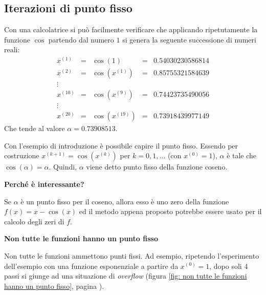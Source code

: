\subsection{Iterazioni di punto fisso}

\begin{examplebox}
    Con una calcolatrice si può facilmente verificare che applicando ripetutamente la funzione $\cos$ partendo dal numero $1$ si genera la seguente successione di numeri reali:
    \begin{equation*}
        \begin{array}{lclcl}
            x^{\left(1\right)}  &=& \cos\left(1\right)                  &=& 0.54030230586814 \\ [1em]
            x^{\left(2\right)}  &=& \cos\left(x^{\left(1\right)}\right) &=& 0.85755321584639 \\
            \vdots              & &                                     & & \\
            x^{\left(10\right)} &=& \cos\left(x^{\left(9\right)}\right) &=& 0.74423735490056 \\
            \vdots              & &                                     & & \\
            x^{\left(20\right)} &=& \cos\left(x^{\left(19\right)}\right)&=& 0.73918439977149
        \end{array}
    \end{equation*}
    Che tende al valore $\alpha = 0.73908513$.
\end{examplebox}

\noindent
Con l'esempio di introduzione è possibile capire il punto fisso. Essendo per costruzione $x^{\left(k+1\right)} = \cos\left(x^{\left(k\right)}\right)$ per $k = 0, 1, \dots$ (con $x^{\left(0\right)} = 1$), $\alpha$ è tale che $\cos\left(\alpha\right) = \alpha$. Quindi, $\alpha$ viene detto punto fisso della funzione coseno.

\highspace
\begin{flushleft}
    \textcolor{Green3}{ \textbf{Perché è interessante?}}
\end{flushleft}
Se $\alpha$ è un punto fisso per il coseno, allora esso è uno zero della funzione $f\left(x\right) = x - \cos\left(x\right)$ ed il metodo appena proposto potrebbe essere usato per il calcolo degli zeri di $f$.

\highspace
\begin{flushleft}
    \textcolor{Red2}{ \textbf{Non tutte le funzioni hanno un punto fisso}}
\end{flushleft}
Non tutte le funzioni ammettono punti fissi. Ad esempio, ripetendo l'esperimento dell'esempio con una funzione esponenziale a partire da $x^{\left(0\right)} = 1$, dopo soli 4 passi si giunge ad una situazione di \emph{overflow} (figura \ref{fig: non tutte le funzioni hanno un punto fisso}, pagina \pageref{fig: non tutte le funzioni hanno un punto fisso}).

